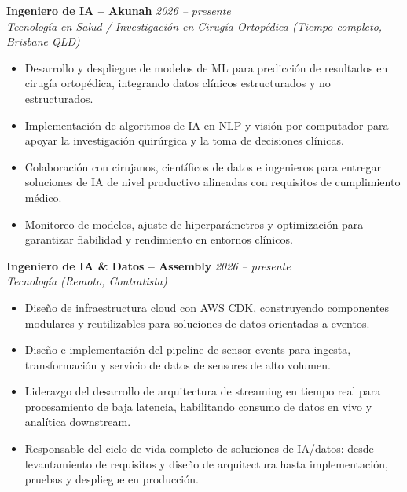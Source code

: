 \textbf{Ingeniero de IA – Akunah} \hfill \textit{2026 – presente} \\
\textit{Tecnología en Salud / Investigación en Cirugía Ortopédica (Tiempo completo, Brisbane QLD)} \\[-0.6em]
\begin{itemize}[leftmargin=*]
    \item Desarrollo y despliegue de modelos de ML para predicción de resultados en cirugía ortopédica, integrando datos clínicos estructurados y no estructurados.
    \item Implementación de algoritmos de IA en NLP y visión por computador para apoyar la investigación quirúrgica y la toma de decisiones clínicas.
    \item Colaboración con cirujanos, científicos de datos e ingenieros para entregar soluciones de IA de nivel productivo alineadas con requisitos de cumplimiento médico.
    \item Monitoreo de modelos, ajuste de hiperparámetros y optimización para garantizar fiabilidad y rendimiento en entornos clínicos.
\end{itemize}

\vspace{0.1em}

\textbf{Ingeniero de IA \& Datos – Assembly} \hfill \textit{2026 – presente} \\
\textit{Tecnología (Remoto, Contratista)} \\[-0.6em]
\begin{itemize}[leftmargin=*]
    \item Diseño de infraestructura cloud con AWS CDK, construyendo componentes modulares y reutilizables para soluciones de datos orientadas a eventos.
    \item Diseño e implementación del pipeline de sensor-events para ingesta, transformación y servicio de datos de sensores de alto volumen.
    \item Liderazgo del desarrollo de arquitectura de streaming en tiempo real para procesamiento de baja latencia, habilitando consumo de datos en vivo y analítica downstream.
    \item Responsable del ciclo de vida completo de soluciones de IA/datos: desde levantamiento de requisitos y diseño de arquitectura hasta implementación, pruebas y despliegue en producción.
\end{itemize}

\vspace{0.1em}

